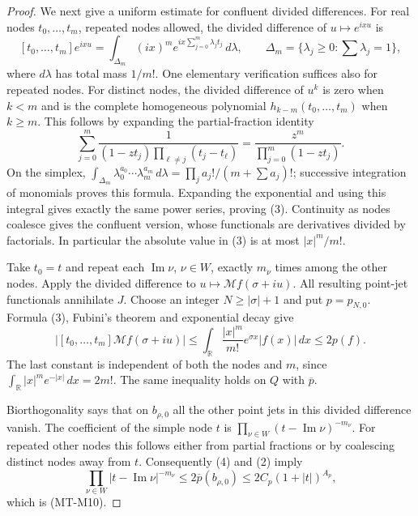 \documentclass[11pt,a4paper]{article}
\begin{document}
\begin{proof}
We next give a uniform estimate for confluent divided differences.
For real nodes $t_0,\ldots,t_m$, repeated nodes allowed, the
divided difference of $u\mapsto e^{ixu}$ is
\[
 [t_0,\ldots,t_m]e^{ixu}
   =\int_{\Delta_m}(ix)^m
           e^{ix\sum_{j=0}^m\lambda_jt_j}\,d\lambda,
 \qquad
 \Delta_m=\{\lambda_j\ge0:\textstyle\sum\lambda_j=1\},
                                                        \tag{3}
\]
where $d\lambda$ has total mass $1/m!$.
One elementary verification suffices also for repeated nodes.
For distinct nodes, the divided difference of $u^k$ is zero
when $k<m$ and is the complete homogeneous polynomial
$h_{k-m}(t_0,\ldots,t_m)$ when $k\ge m$. This follows by
expanding the partial-fraction identity
\[
 \sum_{j=0}^m
 \frac{1}{(1-zt_j)\prod_{\ell\ne j}(t_j-t_\ell)}
          =\frac{z^m}{\prod_{j=0}^m(1-zt_j)}.
\]
On the simplex,
$\int_{\Delta_m}\lambda_0^{a_0}\cdots\lambda_m^{a_m}\,d\lambda
=\prod_j a_j!/(m+\sum a_j)!$; successive integration of
monomials proves this formula. Expanding the exponential and
using this integral gives exactly the same power series,
proving (3). Continuity as nodes coalesce gives the confluent
version, whose functionals are derivatives divided by factorials.
In particular the absolute value in (3) is at most $|x|^m/m!$.

Take $t_0=t$ and repeat each $\operatorname{Im}\nu$, $\nu\in W$,
exactly $m_\nu$ times among the other nodes. Apply the divided
difference to $u\mapsto\mathcal Mf(\sigma+iu)$.
All resulting point-jet functionals annihilate $J$.
Choose an integer $N\ge|\sigma|+1$ and put $p=p_{N,0}$.
Formula (3), Fubini's theorem and exponential decay give
\[
 \left|[t_0,\ldots,t_m]\mathcal Mf(\sigma+iu)\right|
 \le\int_{\mathbb R}\frac{|x|^m}{m!}e^{\sigma x}|f(x)|\,dx
 \le2p(f).                                             \tag{4}
\]
The last constant is independent of both the nodes and $m$,
since $\int_{\mathbb R}|x|^m e^{-|x|}\,dx=2m!$.
The same inequality holds on $Q$ with $\overline p$.

Biorthogonality says that on $b_{\rho,0}$ all the other
point jets in this divided difference vanish. The coefficient
of the simple node $t$ is
$\prod_{\nu\in W}(t-\operatorname{Im}\nu)^{-m_\nu}$.
For repeated other nodes this follows either from partial
fractions or by coalescing distinct nodes away from $t$.
Consequently (4) and (2) imply
\[
 \prod_{\nu\in W}|t-\operatorname{Im}\nu|^{-m_\nu}
       \le2\overline p(b_{\rho,0})
       \le2C_p(1+|t|)^{A_p},
\]
which is (MT-M10).
\end{proof}
\end{document}
